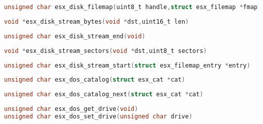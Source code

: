 \documentclass[11pt]{book}
\def\lthtmlcheckvsize{\ifdim\ht\sizebox<\vsize 
  \ifdim\wd\sizebox<\hsize\expandafter\hfill\fi \expandafter\vfill
  \else\expandafter\vss\fi}%
\begin{document}
{\newpage\clearpage
{}%
\begin{lstlisting}[language=C]
unsigned char esx_disk_filemap(uint8_t handle,struct esx_filemap *fmap)
\end{lstlisting}%
\lthtmlfigureZ
\lthtmlcheckvsize\clearpage}

{\newpage\clearpage
{}%
\begin{lstlisting}[language=C]
void *esx_disk_stream_bytes(void *dst,uint16_t len)
\end{lstlisting}%
\lthtmlfigureZ
\lthtmlcheckvsize\clearpage}

{\newpage\clearpage
{}%
\begin{lstlisting}[language=C]
unsigned char esx_disk_stream_end(void)
\end{lstlisting}%
\lthtmlfigureZ
\lthtmlcheckvsize\clearpage}

{\newpage\clearpage
{}%
\begin{lstlisting}[language=C]
void *esx_disk_stream_sectors(void *dst,uint8_t sectors)
\end{lstlisting}%
\lthtmlfigureZ
\lthtmlcheckvsize\clearpage}

{\newpage\clearpage
{}%
\begin{lstlisting}[language=C]
unsigned char esx_disk_stream_start(struct esx_filemap_entry *entry)
\end{lstlisting}%
\lthtmlfigureZ
\lthtmlcheckvsize\clearpage}

{\newpage\clearpage
{}%
\begin{lstlisting}[language=C]
unsigned char esx_dos_catalog(struct esx_cat *cat)
\end{lstlisting}%
\lthtmlfigureZ
\lthtmlcheckvsize\clearpage}

{\newpage\clearpage
{}%
\begin{lstlisting}[language=C]
unsigned char esx_dos_catalog_next(struct esx_cat *cat)
\end{lstlisting}%
\lthtmlfigureZ
\lthtmlcheckvsize\clearpage}

{\newpage\clearpage
{}%
\begin{lstlisting}[language=C]
unsigned char esx_dos_get_drive(void)
unsigned char esx_dos_set_drive(unsigned char drive)
\end{lstlisting}%
\lthtmlfigureZ
\lthtmlcheckvsize\clearpage}
\end{document}
